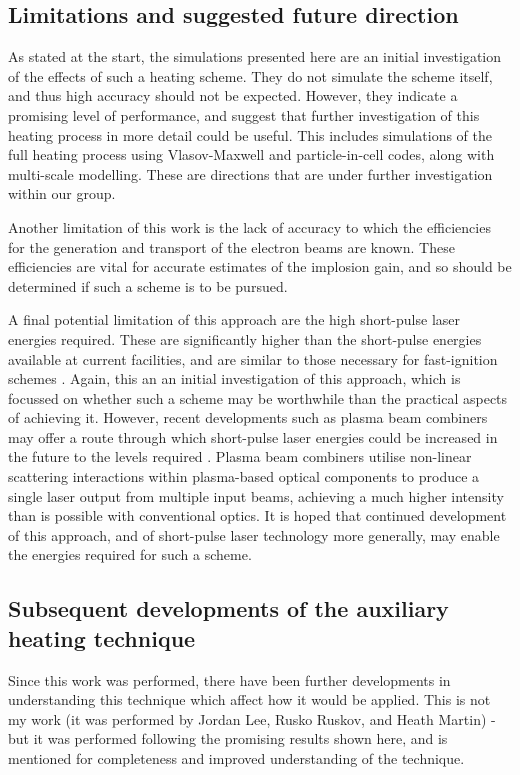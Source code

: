 \subsection{Limitations and suggested future direction}

As stated at the start, the simulations presented here are an initial investigation of the effects of such a heating scheme. They do not simulate the scheme itself, and thus high accuracy should not be expected. However, they indicate a promising level of performance, and suggest that further investigation of this heating process in more detail could be useful. This includes simulations of the full heating process using Vlasov-Maxwell and particle-in-cell codes, along with multi-scale modelling. These are directions that are under further investigation within our group.

Another limitation of this work is the lack of accuracy to which the efficiencies for the generation and transport of the electron beams are known. These efficiencies are vital for accurate estimates of the implosion gain, and so should be determined if such a scheme is to be pursued.

A final potential limitation of this approach are the high short-pulse laser energies required. These are significantly higher than the short-pulse energies available at current facilities, and are similar to those necessary for fast-ignition schemes \cite{Strozzi2012}. Again, this an an initial investigation of this approach, which is focussed on whether such a scheme may be worthwhile than the practical aspects of achieving it. However, recent developments such as plasma beam combiners \cite{Kirkwood2018,Kirkwood2018a} may offer a route through which short-pulse laser energies could be increased in the future to the levels required \cite{KirkwoodPersonalComm}. Plasma beam combiners utilise non-linear scattering interactions within plasma-based optical components to produce a single laser output from multiple input beams, achieving a much higher intensity than is possible with conventional optics. It is hoped that continued development of this approach, and of short-pulse laser technology more generally, may enable the energies required for such a scheme.

\subsection{Subsequent developments of the auxiliary heating technique}
Since this work was performed, there have been further developments in understanding this technique which affect how it would be applied. This is not my work (it was performed by Jordan Lee, Rusko Ruskov, and Heath Martin) - but it was performed following the promising results shown here, and is mentioned for completeness and improved understanding of the technique.

